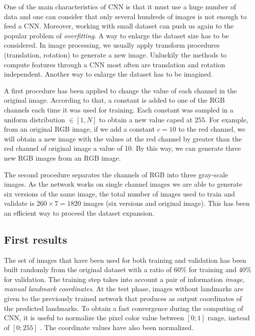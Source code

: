 \documentclass[10pt]{article}
\begin{document}
One of the main characteristics of CNN is that it must use a huge number of data 
and one can consider that only several hundreds of images is
not enough to feed a CNN. Moreover, working with small dataset can push
us again to the popular problem of \textit{overfitting}. A way to enlarge the dataset size has to be considered. In image processing, we usually apply
transform procedures (translation, rotation) to generate a new image. 
Unluckily the methods to compute features through a CNN
most often are translation and rotation independent. Another way to
enlarge the dataset has to be imagined.


A first procedure has been applied to change the value of each
channel in the original image. According to that, a constant is
added to one of the RGB channels each time it was used for training.
Each constant was sampled in a uniform distribution $\in [1,N]$ to obtain
a new value caped at $255$. For example, from
an original RGB image, if we add a constant $c = 10$ to the
red channel, we will obtain a new image with the values at
the red channel by greater than the red channel of original image
a value of 10. By this way, we can generate three new RGB
images from an RGB image.

The second procedure separates the channels of RGB into
three gray-scale images. As the network works on single channel images
we are able to  generate six versions of the same image, the total number of
images used to train and validate is $260 \times 7 = 1820$ images
(six versions and original image). This has been an efficient way to
proceed the dataset expansion. 


\subsection{First results}
\label{sectrain1}
The set of images that have been used for both training and validation
has been built randomly from the original dataset with a ratio of
$60\%$ for training and $40\%$ for  validation. The training step
takes into account a pair of information \textit{{image, manual
  landmark coordinates}}. At the test phase, images without landmarks
are given to the previously trained network that produces as output
coordinates of the predicted landmarks. To obtain a fast convergence
during the computing of CNN, it is useful to normalize the pixel
color value between $[0; 1]$ range, instead of $[0; 255]$  \cite{lecun2012efficient}. The
coordinate values have also been normalized.
\end{document}
